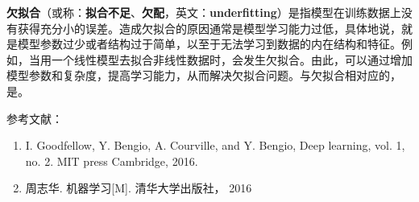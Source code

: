 

\textbf{欠拟合}（或称：\textbf{拟合不足}、\textbf{欠配}，英文：\textbf{underfitting}）是指模型在训练数据上没有获得充分小的误差。造成欠拟合的原因通常是模型学习能力过低，具体地说，就是模型参数过少或者结构过于简单，以至于无法学习到数据的内在结构和特征。例如，当用一个线性模型去拟合非线性数据时，会发生欠拟合。由此，可以通过增加模型参数和复杂度，提高学习能力，从而解决欠拟合问题。与欠拟合相对应的，是。



参考文献：
\begin{enumerate}
\item I. Goodfellow, Y. Bengio, A. Courville, and Y. Bengio, Deep learning, vol. 1, no. 2. MIT press Cambridge, 2016.
\item 周志华. 机器学习[M]. 清华大学出版社， 2016
\end{enumerate}
